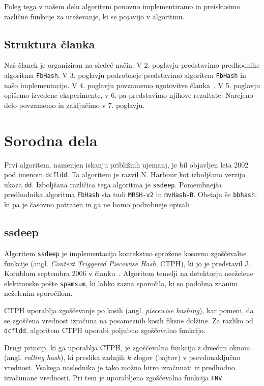 \documentclass{acm_proc_article-sp}
\begin{document}
Poleg tega v našem delu algoritem ponovno implementiramo in preiskusimo različne funkcije za uteževanje, ki se pojavijo v algoritmu.

\subsection{Struktura članka}

Naš članek je organiziran na sledeč način. V 2. poglavju predstavimo predhodnike algoritma \texttt{FbHash}. V 3. poglavju podrobneje predstavimo algoritem \texttt{FbHash} in našo implementacijo. V 4. poglavju povzamemo ugotovitve članka~\cite{fbhash}. V 5. poglavju opišemo izvedene eksperimente, v 6. pa predstavimo njihove rezultate. Narejeno delo povzamemo in zaključimo v 7. poglavju.

\section{Sorodna dela}
Prvi algoritem, namenjen iskanju približnih ujemanj, je bil objavljen leta 2002 pod imenom \texttt{dcfldd}. Ta algoritem je razvil N. Harbour kot izboljšano verzijo ukaza \texttt{dd}\cite{dcfldd}. Izboljšana različica tega algoritma je \texttt{ssdeep}. Pomembnejša predhodnika algoritma \texttt{FbHash} sta tudi \texttt{MRSH-v2} in \texttt{mvHash-B}. Obstaja še \texttt{bbhash}, ki pa je časovno potraten in ga ne bomo podrobneje opisali.

\subsection{ssdeep}
Algoritem \texttt{ssdeep} je implementacija kontekstno sprožene kosovno zgoščevalne funkcije (angl. \emph{Context Triggered Piecewise Hash}, CTPH), ki jo je predstavil J. Kornblum septembra 2006 v članku~\cite{kornblum:ctph}. Algoritem temelji na detektorju neeželene elektronske pošte \texttt{spamsum}, ki lahko zazna sporočila, ki so podobna znanim neželenim sporočilom.

CTPH uporablja zgoščevanje po kosih (angl. \emph{piecewise hashing}), kar pomeni, da se zgoščena vrednost izračuna na posameznih kosih fiksne dolžine. Za razliko od \texttt{dcfldd}, algoritem CTPH uporabi poljubno zgoščevalno funkcijo.

Drugi princip, ki ga uporablja CTPH, je zgoščevalna funkcija z drsečim oknom (angl. \emph{rolling hash}), ki preslika zadnjih $k$ zlogov (bajtov) v psevdonaključno vrednost. Vsakega naslednika je tako možno hitro izračunati iz predhodno izračunane vrednosti. Pri tem je uporabljena zgoščevalna funkcija \texttt{FNV}.
\end{document}
